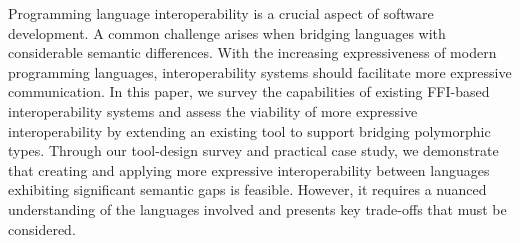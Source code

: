 Programming language interoperability is a crucial aspect of software development. A common challenge arises when bridging languages with considerable semantic differences. 
With the increasing expressiveness of modern programming languages, interoperability systems should facilitate more expressive communication. In this paper, we survey the capabilities of existing FFI-based interoperability systems and assess the viability of more expressive interoperability by extending an existing tool to support bridging polymorphic types. Through our tool-design survey and practical case study, we demonstrate that creating and applying more expressive interoperability between languages exhibiting significant semantic gaps is feasible. However, it requires a nuanced understanding of the languages involved and presents key trade-offs that must be considered.